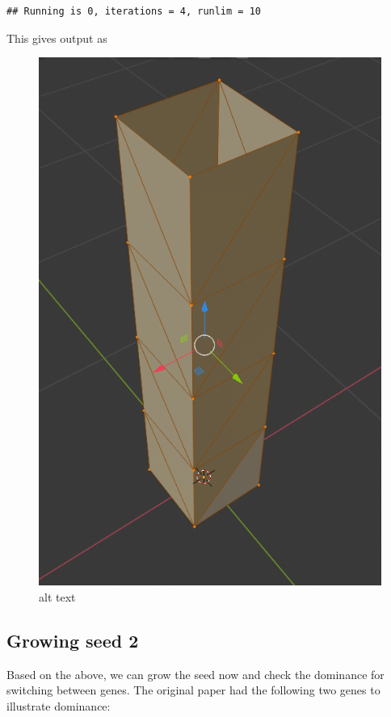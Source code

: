 \documentclass[]{article}
\begin{document}
\begin{verbatim}
## Running is 0, iterations = 4, runlim = 10
\end{verbatim}

This gives output as

\begin{figure}
\centering
\includegraphics{blender_seed1.png}
\caption{alt text}
\end{figure}

\hypertarget{growing-seed-2}{%
\subsection{Growing seed 2}\label{growing-seed-2}}

Based on the above, we can grow the seed now and check the dominance for
switching between genes. The original paper had the following two genes
to illustrate dominance:
\end{document}
